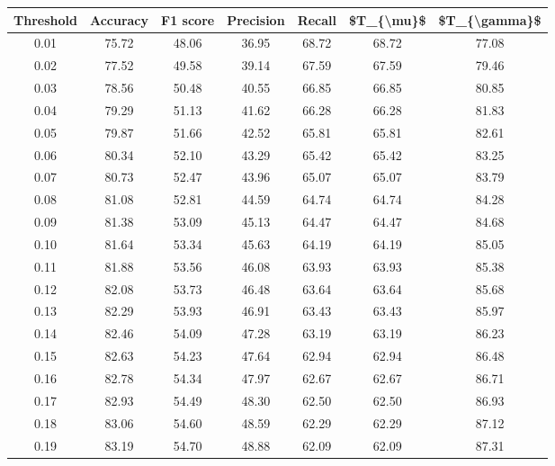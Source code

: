 \begin{tabular}{|c|c|c|c|c|c|c|}
\hline
 Threshold &  Accuracy &  F1 score &  Precision &  Recall &  \$T\_\{\textbackslash mu\}\$ &  \$T\_\{\textbackslash gamma\}\$ \\
\hline
      0.01 &     75.72 &     48.06 &      36.95 &   68.72 &      68.72 &         77.08 \\
      0.02 &     77.52 &     49.58 &      39.14 &   67.59 &      67.59 &         79.46 \\
      0.03 &     78.56 &     50.48 &      40.55 &   66.85 &      66.85 &         80.85 \\
      0.04 &     79.29 &     51.13 &      41.62 &   66.28 &      66.28 &         81.83 \\
      0.05 &     79.87 &     51.66 &      42.52 &   65.81 &      65.81 &         82.61 \\
      0.06 &     80.34 &     52.10 &      43.29 &   65.42 &      65.42 &         83.25 \\
      0.07 &     80.73 &     52.47 &      43.96 &   65.07 &      65.07 &         83.79 \\
      0.08 &     81.08 &     52.81 &      44.59 &   64.74 &      64.74 &         84.28 \\
      0.09 &     81.38 &     53.09 &      45.13 &   64.47 &      64.47 &         84.68 \\
      0.10 &     81.64 &     53.34 &      45.63 &   64.19 &      64.19 &         85.05 \\
      0.11 &     81.88 &     53.56 &      46.08 &   63.93 &      63.93 &         85.38 \\
      0.12 &     82.08 &     53.73 &      46.48 &   63.64 &      63.64 &         85.68 \\
      0.13 &     82.29 &     53.93 &      46.91 &   63.43 &      63.43 &         85.97 \\
      0.14 &     82.46 &     54.09 &      47.28 &   63.19 &      63.19 &         86.23 \\
      0.15 &     82.63 &     54.23 &      47.64 &   62.94 &      62.94 &         86.48 \\
      0.16 &     82.78 &     54.34 &      47.97 &   62.67 &      62.67 &         86.71 \\
      0.17 &     82.93 &     54.49 &      48.30 &   62.50 &      62.50 &         86.93 \\
      0.18 &     83.06 &     54.60 &      48.59 &   62.29 &      62.29 &         87.12 \\
      0.19 &     83.19 &     54.70 &      48.88 &   62.09 &      62.09 &         87.31 \\

\end{tabular}
